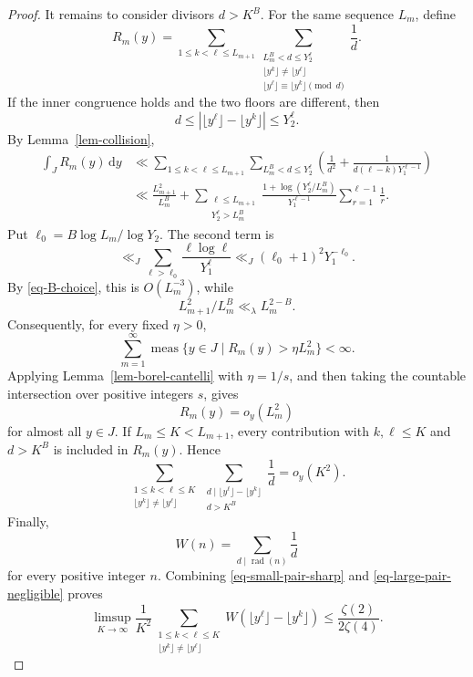 \documentclass[11pt,reqno]{amsart}
\numberwithin{equation}{section}
\begin{document}
\begin{proof}
        It remains to consider divisors $d>K^B$. For the same sequence $L_m$, define
        $$
        R_m(y)=\sum_{1\le k<\ell\le L_{m+1}}
        \sum_{\substack{L_m^B<d\le Y_2^\ell\\
                \lfloor y^k\rfloor\ne\lfloor y^\ell\rfloor\\
                \lfloor y^\ell\rfloor\equiv\lfloor y^k\rfloor\pmod d}}
        \frac1d.
        $$
        If the inner congruence holds and the two floors are different, then
        $$
        d\le \left|\lfloor y^\ell\rfloor-\lfloor y^k\rfloor\right|\le Y_2^\ell.
        $$
        By Lemma~\ref{lem-collision},
        \begin{align*}
            \int_J R_m(y)\,\mathrm{d}y
            &\ll \sum_{1\le k<\ell\le L_{m+1}}
            \sum_{L_m^B<d\le Y_2^\ell}
            \left(\frac1{d^2}+\frac1{d(\ell-k)Y_1^{\ell-1}}\right)\\
            &\ll \frac{L_{m+1}^2}{L_m^B}
            +\sum_{\substack{\ell\le L_{m+1}\\Y_2^\ell>L_m^B}}
            \frac{1+\log(Y_2^\ell/L_m^B)}{Y_1^{\ell-1}}
            \sum_{r=1}^{\ell-1}\frac1r.
        \end{align*}
        Put $\ell_0=B\log L_m/\log Y_2$. The second term is
        $$
        \ll_J \sum_{\ell>\ell_0}\frac{\ell\log \ell}{Y_1^\ell}
        \ll_J (\ell_0+1)^2Y_1^{-\ell_0}.
        $$
        By \eqref{eq-B-choice}, this is $O(L_m^{-3})$, while
        $$
        L_{m+1}^2/L_m^B\ll_\lambda L_m^{2-B}.
        $$
        Consequently, for every fixed $\eta>0$,
        $$
        \sum_{m=1}^{\infty}
        \operatorname{meas}\{y\in J\mid R_m(y)>\eta L_m^2\}<\infty.
        $$
        Applying Lemma~\ref{lem-borel-cantelli} with $\eta=1/s$, and then taking the countable intersection over positive integers $s$, gives
        $$
        R_m(y)=o_y(L_m^2)
        $$
        for almost all $y\in J$. If $L_m\le K<L_{m+1}$, every contribution with $k,\ell\le K$ and $d>K^B$ is included in $R_m(y)$. Hence
        \begin{equation}\label{eq-large-pair-negligible}
            \sum_{\substack{1\le k<\ell\le K\\ \lfloor y^k\rfloor\ne\lfloor y^\ell\rfloor}}
            \sum_{\substack{d\mid \lfloor y^\ell\rfloor-\lfloor y^k\rfloor\\d>K^B}}\frac1d
            =o_y(K^2).
        \end{equation}
        Finally,
        $$
        W(n)=\sum_{d\mid \operatorname{rad}(n)}\frac{1}{d}
        $$
        for every positive integer $n$. Combining \eqref{eq-small-pair-sharp} and \eqref{eq-large-pair-negligible} proves
        \begin{equation}\label{eq-pair-upper}
            \limsup_{K\to\infty}\frac1{K^2}
            \sum_{\substack{1\le k<\ell\le K\\
                    \lfloor y^k\rfloor\ne\lfloor y^\ell\rfloor}}
            W\!\left(\lfloor y^\ell\rfloor-\lfloor y^k\rfloor\right)
            \le \frac{\zeta(2)}{2\zeta(4)}.
        \end{equation}


\end{proof}
\end{document}
